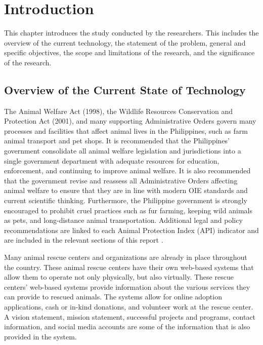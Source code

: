 \chapter{Introduction}
\label{sec:researchdesc}    %
This chapter introduces the study conducted by the researchers. This includes the overview of the current technology, the statement of the problem, general and specific objectives, the scope and limitations of the research, and the significance of the research. 

\section{Overview of the Current State of Technology}
\label{sec:overview}

The Animal Welfare Act (1998), the Wildlife Resources Conservation and
Protection Act (2001), and many supporting Administrative Orders govern many
processes and facilities that affect animal lives in the Philippines, such as farm
animal transport and pet shops. It is recommended that the Philippines’ government
consolidate all animal welfare legislation and jurisdictions into a single
government department with adequate resources for education, enforcement, and
continuing to improve animal welfare. It is also recommended that the government
revise and reassess all Administrative Orders affecting animal welfare to ensure
that they are in line with modern OIE standards and current scientific thinking.
Furthermore, the Philippine government is strongly encouraged to prohibit cruel
practices such as fur farming, keeping wild animals as pets, and long-distance
animal transportation. Additional legal and policy recommendations are linked
to each Animal Protection Index (API) indicator and are included in the relevant
sections of this report \cite{animalprotect00phil}.
   
Many animal rescue centers and organizations are already in place throughout
the country. These animal rescue centers have their own web-based systems that
allow them to operate not only physically, but also virtually. These rescue centers’
web-based systems provide information about the various services they can provide
to rescued animals. The systems allow for online adoption applications, cash or
in-kind donations, and volunteer work at the rescue center. A vision statement,
mission statement, successful projects and programs, contact information, and
social media accounts are some of the information that is also provided in the
system.


